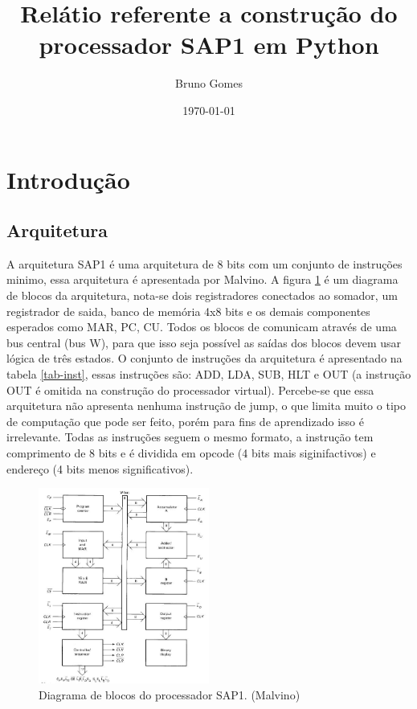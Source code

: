 \documentclass[11pt, twocolumn]{article}
\begin{document}
\title{Relátio referente a construção do processador SAP1 em Python}
\author{Bruno Gomes}
\date{\today}

\section{Introdução}
\subsection{Arquitetura}
   A arquitetura SAP1 é uma arquitetura de 8 bits com um conjunto de instruções minimo, essa arquitetura é apresentada por Malvino. A figura \ref{fig-blocks} é um diagrama de blocos da arquitetura, nota-se dois registradores conectados ao somador, um registrador de saida, banco de memória 4x8 bits e os demais componentes esperados como MAR, PC, CU. Todos os blocos de comunicam através de uma bus central (bus W), para que isso seja possível as saídas dos blocos devem usar lógica de três estados. O conjunto de instruções da arquitetura é apresentado na tabela \ref{tab-inst}, essas instruções são: ADD, LDA, SUB, HLT e OUT (a instrução OUT é omitida na construção do processador virtual). Percebe-se que essa arquitetura não apresenta nenhuma instrução de jump, o que limita muito o tipo de computação que pode ser feito, porém para fins de aprendizado isso é irrelevante. Todas as instruções seguem o mesmo formato, a instrução tem comprimento de 8 bits e é dividida em opcode (4 bits mais siginifactivos) e endereço (4 bits menos significativos).

   \begin{figure}
     \includegraphics[width=0.5\textwidth]{blocks.jpg}
     \caption{Diagrama de blocos do processador SAP1. (Malvino)}
     \label{fig-blocks}
   \end{figure}
   
\end{document}
